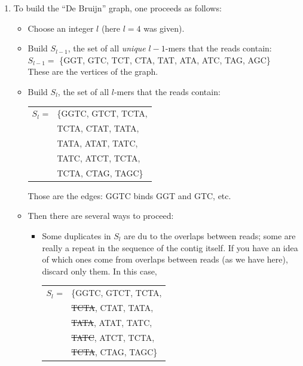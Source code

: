 \documentclass[a4paper,11pt]{article}
\begin{document}
\begin{enumerate}
\item To build the ``De Bruijn'' graph, one proceeds as follows:
	\begin{itemize}
	\item Choose an integer $l$ (here $l=4$ was given). 
	\item Build $S_{l-1}$, the set of all \textit{unique} $l-1$-mers that the reads contain:\\
		$S_{l-1}=$ \{GGT, GTC, TCT, CTA, TAT, ATA, ATC, TAG, AGC\}\\
		These are the vertices of the graph.
	\item Build $S_l$, the set of all $l$-mers that the reads contain:\\
		\begin{tabular}{ll}
		$S_l$ = & \{GGTC, GTCT, TCTA,\\
		              &  TCTA, CTAT, TATA,\\
		              &  TATA, ATAT, TATC,\\
		              &  TATC, ATCT, TCTA,\\
		              &  TCTA, CTAG, TAGC\}
		\end{tabular}
		
		Those are the edges: GGTC binds GGT and GTC, etc. 
	\item Then there are several ways to proceed:
		\begin{itemize}
		\item Some duplicates in $S_l$ are du to the overlaps between reads; some are really a repeat in the sequence of the contig itself. If you have an idea of which ones come from overlaps between reads (as we have here), discard only them. In this case,  
			\begin{tabular}{ll}
		         $S_l$ = & \{GGTC, GTCT, TCTA,\\
		              &  \sout{TCTA}, CTAT, TATA,\\
		              &  \sout{TATA}, ATAT, TATC,\\
		              &  \sout{TATC}, ATCT, TCTA,\\
		              &  \sout{TCTA}, CTAG, TAGC\}
		        \end{tabular}
		        

\end{itemize}
\end{itemize}
\end{enumerate}
\end{document}
